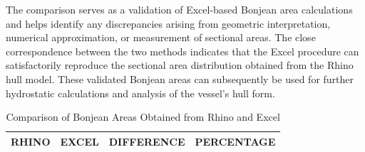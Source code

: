 \documentclass[12pt,a4paper,twoside]{report}
\begin{document}
\vspace{\baselineskip}\par\noindent The comparison serves as a validation of Excel-based Bonjean area calculations and helps identify any discrepancies arising from geometric interpretation, numerical approximation, or measurement of sectional areas. The close correspondence between the two methods indicates that the Excel procedure can satisfactorily reproduce the sectional area distribution obtained from the Rhino hull model. These validated Bonjean areas can subsequently be used for further hydrostatic calculations and analysis of the vessel's hull form.

\begin{table}[H]
\centering
\caption{Comparison of Bonjean Areas Obtained from Rhino and Excel}
\vspace{2mm}
\label{tab:rhino_excel_bonjean}

\small
\setlength{\tabcolsep}{4pt}

\begin{tabular}{c c c c}
\hline

\textbf{RHINO} &
\textbf{EXCEL} &
\textbf{DIFFERENCE} &
\textbf{PERCENTAGE} \\

\hline


\end{tabular}
\end{table}
\end{document}
